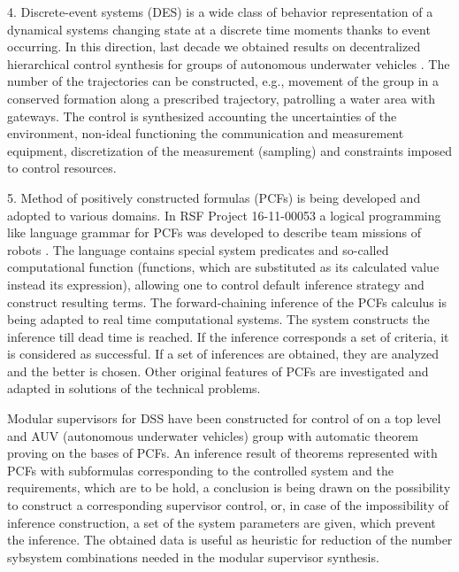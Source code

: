 \documentclass[runningheads]{llncs}
\begin{document}
    4. Discrete-event systems (DES) is a wide class of behavior representation of a dynamical systems changing state at a discrete time moments thanks to event occurring. In this direction, last decade we obtained results on decentralized hierarchical control synthesis for groups of autonomous underwater vehicles \cite{b4}. The number of the trajectories can be constructed, e.g., movement of the group in a conserved formation along a prescribed trajectory, patrolling a water area with gateways. The control is synthesized accounting the uncertainties of the environment, non-ideal functioning the communication and measurement equipment, discretization of the measurement (sampling) and constraints imposed to control resources.

    5. Method of positively constructed formulas (PCFs) is being developed and adopted to various domains. In RSF Project 16-11-00053 a logical programming like language grammar for PCFs was developed to describe team missions of robots \cite{b5}. The language contains special system predicates and so-called computational function (functions, which are substituted as its calculated value instead its expression), allowing one to control default inference strategy and construct resulting terms. The forward-chaining inference of the PCFs calculus is being adapted to real time computational systems. The system constructs the inference till dead time is reached. If the inference corresponds a set of criteria, it is considered as successful. If a set of inferences are obtained, they are analyzed and the better is chosen. Other original features of PCFs are investigated and adapted in solutions of the technical problems.

Modular supervisors for DSS have been constructed for control of on a top level and AUV (autonomous underwater vehicles) group with automatic theorem proving on the bases of PCFs. An inference result of theorems represented with PCFs with subformulas corresponding to the controlled system and the requirements, which are to be hold, a conclusion is being drawn on the possibility to construct a corresponding supervisor control, or, in case of the impossibility of inference construction, a set of the system parameters are given, which prevent the inference. The obtained data is useful as heuristic for reduction of the number sybsystem combinations needed in the modular supervisor synthesis.
\end{document}
